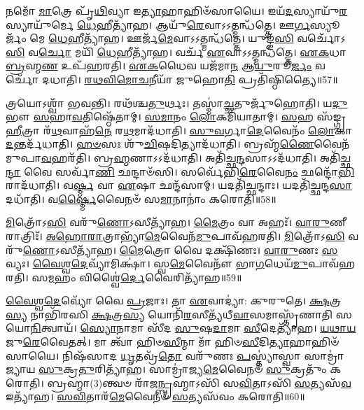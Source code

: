 𑌨𑌮𑍋᳴ \ul{𑌮𑌾}\-𑌤𑍍𑌰𑍇 𑌪𑍃᳴\-\ul{𑌥𑌿}\-𑌵𑍍𑌯𑌾 𑌇\-\ul{𑌤𑍍𑌯𑌾}\-𑌹𑌾𑌹𑌿𑍞᳴𑌸𑌾𑌯𑍈।
𑌇𑌯᳴\-\ul{𑌦}\-𑌸𑍍𑌯𑌾𑌯𑍁᳴\-\ul{𑌰}\-𑌸𑍍𑌯𑌾𑌯𑍁᳴𑌰𑍍𑌮𑍇 \ul{𑌧𑍇}\-𑌹𑍀𑌤𑍍𑌯𑌾᳴𑌹।
𑌆𑌯𑍁᳴\-\ul{𑌰𑍇}\-𑌵𑌾𑌽𑌽𑌤𑍍𑌮𑌨𑍍𑌧᳴𑌤𑍍𑌤𑍇।
𑌊\-\ul{𑌰𑍍𑌗}\-𑌸𑍍𑌯𑍂𑌰𑍍𑌜𑌂᳴ 𑌮𑍇 \ul{𑌧𑍇}\-𑌹𑍀𑌤𑍍𑌯𑌾᳴𑌹।
𑌊𑌰𑍍𑌜᳴\-\ul{𑌮𑍇}\-𑌵𑌾𑌽𑌽𑌤𑍍𑌮𑌨𑍍𑌧᳴𑌤𑍍𑌤𑍇।
𑌯𑍁𑌙𑍍𑌙᳴\-\ul{𑌸𑌿} 𑌵𑌰𑍍𑌚𑍋᳴𑌽\-\ul{𑌸𑌿} 𑌵\-\ul{𑌰𑍍𑌚𑍋} 𑌮𑌯𑌿᳴ \ul{𑌧𑍇}\-𑌹𑍀𑌤𑍍𑌯𑌾᳴𑌹।
𑌵𑌰𑍍𑌚᳴ \ul{𑌏}\-𑌵𑌾𑌽𑌽𑌤𑍍𑌮𑌨𑍍𑌧᳴𑌤𑍍𑌤𑍇।
\-\ul{𑌏}\-\-\ul{𑌕}\-𑌧𑌾 \ul{𑌬𑍍𑌰}\-𑌹𑍍𑌮\-\ul{𑌣} 𑌉𑌪᳴𑌹𑌰𑌤𑌿।
\-\ul{𑌏}\-\-\ul{𑌕}\-𑌧𑍈𑌵 𑌯𑌜᳴𑌮𑌾\-\ul{𑌨} 𑌆\-\ul{𑌯𑍁}\-𑌰𑍂\-\ul{𑌰𑍍𑌜𑌂} 𑌵𑌰𑍍𑌚𑍋᳴ 𑌦𑌧𑌾𑌤𑌿।
\-\ul{𑌰}\-\-\ul{𑌥}\-\-\ul{𑌵𑌿}\-\-\ul{𑌮𑍋}\-\-\ul{𑌚}\-𑌨𑍀𑌯𑌾᳴ 𑌜𑍁𑌹𑍋\-\ul{𑌤𑌿} 𑌪𑍍𑌰𑌤𑌿᳴\-𑌷𑍍𑌠𑌿𑌤𑍍𑌯𑍈॥57॥

𑌤𑍍𑌰𑌯𑍋\-𑌽𑌶𑍍𑌵𑌾᳴ 𑌭𑌵𑌨𑍍𑌤𑌿।
𑌰𑌥᳴𑌶𑍍𑌚\-\ul{𑌤𑍁}\-𑌰𑍍𑌥𑌃।
𑌤𑌸𑍍𑌮𑌾॑\-\ul{𑌚𑍍𑌚}\-𑌤𑍁𑌰𑍍𑌜𑍁᳴𑌹𑍋𑌤𑌿।
𑌯\-\ul{𑌦𑍁}\-𑌭𑍗 \ul{𑌸}\-𑌹𑌾\-\ul{𑌵}\-𑌤𑌿𑌷𑍍𑌠𑍇᳴𑌤𑌾𑌮𑍍।
\-\ul{𑌸}\-\-\ul{𑌮𑌾}\-𑌨𑌂 \ul{𑌲𑍋}\-𑌕𑌮𑌿᳴𑌯𑌾𑌤𑌾𑌮𑍍।
\-\ul{𑌸}\-𑌹 𑌸᳴𑌙𑍍𑌗𑍍𑌰\-\ul{𑌹𑍀}\-𑌤𑍍𑌰𑌾 𑌰᳴\-\ul{𑌥}\-𑌵𑌾𑌹᳴\-\ul{𑌨𑍇} 𑌰\-\ul{𑌥}\-𑌮𑌾𑌦᳴𑌧𑌾𑌤𑌿।
\-\ul{𑌸𑍁}\-\-\ul{𑌵}\-𑌰𑍍𑌗𑌾\-\ul{𑌦𑍇}\-𑌵𑍈𑌨𑌂᳴ \ul{𑌲𑍋}\-𑌕𑌾\-\ul{𑌦}\-𑌨𑍍𑌤𑌰𑍍𑌦᳴𑌧𑌾𑌤𑌿।
\-\ul{𑌹}\-\-\ul{𑍞}\-𑌸𑌃 𑌶𑍁᳴\-\ul{𑌚𑌿}\-𑌷𑌦𑌿𑌤𑍍𑌯𑌾𑌦᳴𑌧𑌾𑌤𑌿।
𑌬𑍍𑌰𑌹𑍍𑌮᳴\-\ul{𑌣𑍈}\-𑌵𑍈𑌨᳴𑌮𑍁𑌪𑌾\-\ul{𑌵}\-𑌹𑌰᳴𑌤𑌿।
𑌬𑍍𑌰\-\ul{𑌹𑍍𑌮}\-𑌣𑌾\-𑌽𑌽𑌦᳴𑌧𑌾𑌤𑌿।
𑌅𑌤𑌿᳴𑌚𑍍𑌛\-\ul{𑌨𑍍𑌦}\-𑌸𑌾\-𑌽𑌽𑌦᳴𑌧𑌾𑌤𑌿।
𑌅𑌤𑌿᳴𑌚𑍍𑌛\-\ul{𑌨𑍍𑌦𑌾} 𑌵𑍈 𑌸𑌰𑍍𑌵𑌾᳴\-\ul{𑌣𑌿} 𑌛𑌨𑍍𑌦𑌾𑍞᳴𑌸𑌿।
𑌸𑌰𑍍𑌵𑍇᳴𑌭𑌿\-\ul{𑌰𑍇}\-𑌵𑍈\-\ul{𑌨𑌂} 𑌛𑌨𑍍𑌦𑍋᳴\-\ul{𑌭𑌿}\-𑌰𑌾𑌦᳴𑌧𑌾𑌤𑌿।
𑌵\-\ul{𑌰𑍍𑌷𑍍𑌮} 𑌵𑌾 \ul{𑌏}\-𑌷𑌾 𑌛𑌨𑍍𑌦᳴𑌸𑌾𑌮𑍍।
𑌯𑌦𑌤𑌿᳴𑌚𑍍𑌛𑌨𑍍𑌦𑌾𑌃।
𑌯𑌦𑌤𑌿᳴𑌚𑍍𑌛𑌨𑍍𑌦\-\ul{𑌸𑌾} 𑌦𑌧𑌾᳴𑌤𑌿।
𑌵\-\ul{𑌰𑍍𑌷𑍍𑌮𑍈}\-𑌵𑍈𑌨𑍞᳴ 𑌸\-\ul{𑌮𑌾}\-𑌨𑌾𑌨𑌾𑌂॑ 𑌕𑌰𑍋𑌤𑌿॥58॥\anuvakamend[\-\ul{𑌪}\-\-\ul{𑌦𑍍𑌯}\-\-\ul{𑌨𑍍𑌤𑍇} \ul{𑌦}\-\-\ul{𑌧𑌾}\-\-\ul{𑌤𑌿} \ul{𑌵𑍀}\-𑌰𑍍𑌯𑍇᳴𑌣𑍇\-\ul{𑌤𑍍𑌯𑌾}\-𑌹𑌾𑌨𑌾॑\-\ul{𑌤𑍍𑌯𑍈} 𑌪𑍍𑌰𑌤𑌿᳴\-𑌷𑍍𑌠𑌿\-\ul{𑌤𑍍𑌯𑍈} 𑌬𑍍𑌰\-\ul{𑌹𑍍𑌮}\-𑌣𑌾\-𑌽𑌽𑌦᳴𑌧𑌾𑌤𑌿 \ul{𑌸}\-𑌪𑍍𑌤 𑌚᳴]

\-\ul{𑌮𑌿}\-𑌤𑍍𑌰𑍋᳴𑌽\-\ul{𑌸𑌿} 𑌵𑌰𑍁᳴\-\ul{𑌣𑍋}\-\-𑌽𑌸𑍀𑌤𑍍𑌯𑌾᳴𑌹।
\-\ul{𑌮𑍈}\-𑌤𑍍𑌰𑌂 𑌵𑌾 𑌅𑌹𑌃᳴।
\-\ul{𑌵𑌾}\-\-\ul{𑌰𑍁}\-𑌣𑍀 𑌰𑌾𑌤𑍍𑌰𑌿𑌃᳴।
\-\ul{𑌅}\-\-\ul{𑌹𑍋}\-\-\ul{𑌰𑌾}\-𑌤𑍍𑌰𑌾𑌭𑍍𑌯𑌾᳴\-\ul{𑌮𑍇}\-𑌵𑍈𑌨᳴\-\ul{𑌮𑍁}\-𑌪𑌾𑌵᳴𑌹𑌰𑌤𑌿।
\-\ul{𑌮𑌿}\-𑌤𑍍𑌰𑍋᳴𑌽\-\ul{𑌸𑌿} 𑌵𑌰𑍁᳴\-\ul{𑌣𑍋}\-\-𑌽𑌸𑍀𑌤𑍍𑌯𑌾᳴𑌹।
\-\ul{𑌮𑍈}\-𑌤𑍍𑌰𑍋 𑌵𑍈 𑌦𑌕𑍍𑌷𑌿᳴𑌣𑌃।
\-\ul{𑌵𑌾}\-\-\ul{𑌰𑍁}\-𑌣𑌃 \ul{𑌸}\-𑌵𑍍𑌯𑌃।
\-\ul{𑌵𑍈}\-\-\ul{𑌶𑍍𑌵}\-\-\ul{𑌦𑍇}\-𑌵𑍍𑌯𑌾᳴𑌮𑌿𑌕𑍍𑌷𑌾॑।
𑌸𑍍𑌵\-\ul{𑌮𑍇}\-𑌵𑍈𑌨𑍗᳴ 𑌭𑌾\-\ul{𑌗}\-𑌧𑍇𑌯᳴\-\ul{𑌮𑍁}\-𑌪𑌾𑌵᳴𑌹𑌰𑌤𑌿।
𑌸\-\ul{𑌮}\-𑌹𑌂 𑌵𑌿𑌶𑍍𑌵𑍈॑\-\ul{𑌰𑍍𑌦𑍇}\-𑌵𑍈𑌰𑌿𑌤𑍍𑌯𑌾᳴𑌹॥59॥

\-\ul{𑌵𑍈}\-\-\ul{𑌶𑍍𑌵}\-\-\ul{𑌦𑍇}\-𑌵𑍍𑌯𑍋᳴ 𑌵𑍈 \ul{𑌪𑍍𑌰}\-𑌜𑌾𑌃।
𑌤𑌾 \ul{𑌏}\-𑌵𑌾𑌦𑍍𑌯𑌾॑: 𑌕𑍁𑌰𑍁𑌤𑍇।
\-\ul{𑌕𑍍𑌷}\-𑌤𑍍𑌰\-\ul{𑌸𑍍𑌯} 𑌨𑌾𑌭𑌿᳴𑌰𑌸𑌿 \ul{𑌕𑍍𑌷}\-𑌤𑍍𑌰\-\ul{𑌸𑍍𑌯} 𑌯𑍋𑌨𑌿᳴\-\ul{𑌰}\-𑌸𑍀𑌤𑍍𑌯᳴𑌧𑍀\-\ul{𑌵𑌾}\-𑌸𑌮𑌾𑌸𑍍𑌤𑍃᳴𑌣𑌾𑌤𑌿 𑌸𑌯𑍋\-\ul{𑌨𑌿}\-𑌤𑍍𑌵𑌾𑌯᳴।
\-\ul{𑌸𑍍𑌯𑍋}\-𑌨𑌾𑌮𑌾 𑌸𑍀᳴𑌦 \ul{𑌸𑍁}\-𑌷\-\ul{𑌦𑌾}\-𑌮𑌾 \ul{𑌸𑍀}\-𑌦𑍇𑌤𑍍𑌯𑌾᳴𑌹।
\-\ul{𑌯}\-\-\ul{𑌥𑌾}\-\-\ul{𑌯}\-𑌜𑍁\-\ul{𑌰𑍇}\-𑌵𑍈𑌤𑌤𑍍।
𑌮𑌾 𑌤𑍍𑌵𑌾᳴ 𑌹𑌿𑍞\-\ul{𑌸𑍀}\-𑌨𑍍𑌮𑌾 𑌮𑌾᳴ 𑌹𑌿𑍞\-\ul{𑌸𑍀}\-𑌦𑌿\-\ul{𑌤𑍍𑌯𑌾}\-𑌹𑌾𑌹𑌿𑍞᳴𑌸𑌾𑌯𑍈।
𑌨𑌿𑌷᳴𑌸𑌾𑌦 \ul{𑌧𑍃}\-𑌤𑌵𑍍𑌰᳴\-\ul{𑌤𑍋} 𑌵𑌰𑍁᳴𑌣𑌃 \ul{𑌪}\-𑌸𑍍𑌤𑍍𑌯𑌾॑𑌸𑍍𑌵𑌾 𑌸𑌾𑌮𑍍𑌰𑌾॑𑌜𑍍𑌯𑌾𑌯 \ul{𑌸𑍁}\-𑌕𑍍𑌰\-\ul{𑌤𑍁}\-𑌰𑌿𑌤𑍍𑌯𑌾᳴𑌹।
𑌸𑌾𑌮𑍍𑌰𑌾॑𑌜𑍍𑌯\-\ul{𑌮𑍇}\-𑌵𑍈𑌨𑍞᳴ \ul{𑌸𑍁}\-𑌕𑍍𑌰𑌤𑍁𑌂᳴ 𑌕𑌰𑍋𑌤𑌿।
𑌬𑍍𑌰𑌹𑍍𑌮𑌾(3)𑌨𑍍𑌤𑍍𑌵𑍞 𑌰𑌾᳴𑌜\-\ul{𑌨𑍍𑌬𑍍𑌰}\-𑌹𑍍𑌮𑌾𑌽𑌸𑌿᳴ 𑌸\-\ul{𑌵𑌿}\-𑌤𑌾𑌽𑌸𑌿᳴ \ul{𑌸}\-𑌤𑍍𑌯𑌸᳴\-\ul{𑌵} 𑌇𑌤𑍍𑌯𑌾᳴𑌹।
\-\ul{𑌸}\-\-\ul{𑌵𑌿}\-𑌤𑌾𑌰᳴\-\ul{𑌮𑍇}\-𑌵𑍈𑌨𑍞᳴ \ul{𑌸}\-𑌤𑍍𑌯𑌸᳴𑌵𑌂 𑌕𑌰𑍋𑌤𑌿॥60॥

